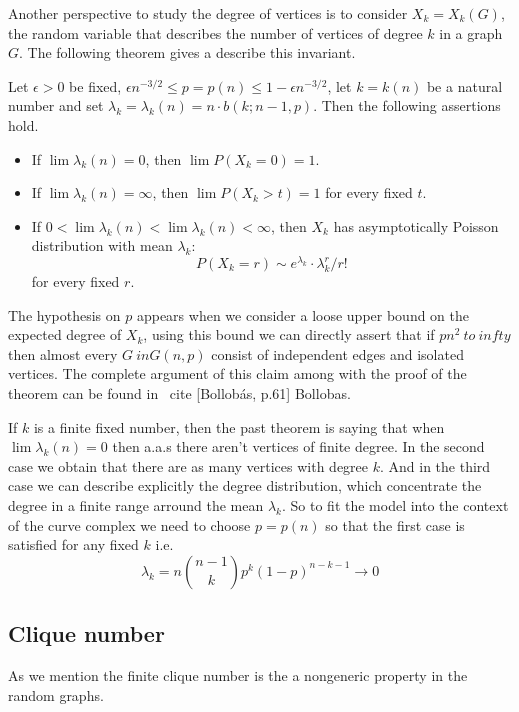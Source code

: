 Another perspective to study the degree of vertices is to consider $X_{k} = X_{k} (G)$, the random variable that describes the number of vertices of degree $k$ in a graph $G$. The following theorem gives a describe this invariant.

\begin{theorem}
Let $\epsilon>0$ be fixed, $\epsilon n^{-3/2} \leq p = p(n) \leq 1 - \epsilon n^{-3/2}$, let $k = k(n)$ be a natural number and set $\lambda_{k} = \lambda_{k}(n) = n\cdot b(k;n - 1,p)$. Then the following assertions hold.

\begin{itemize}
\item If $\lim \lambda_{k}(n) = 0$, then $\lim P(X_{k} = 0) = 1$. 
\item If $\lim \lambda_{k}(n) = \infty$, then $\lim P(X_{k} > t) = 1$
for every fixed $t$.
\item If $0 < \lim\lambda_{k}(n) < \lim \lambda_{k}(n) < \infty$,
then $X_{k}$ has asymptotically Poisson distribution with mean $\lambda_{k}$: 
$$P(X_{k} = r) \sim e^{\lambda_{k}}\cdot \lambda_{k}^{r}/ r!$$
for every fixed $r$.
\end{itemize}
\end{theorem}

The hypothesis on $ p $ appears when we consider a loose upper bound on the expected degree of $ X_ {k} $, using this bound we can directly assert that if $ pn ^ {2} \ to \ infty $ then almost every $ G \ in G (n, p) $ consist of independent edges and isolated vertices. The complete argument of this claim among with the proof of the theorem can be found in \ cite [Bollobás, p.61] {Bollobas}.

If $k$ is a finite fixed number, then the past theorem is saying that when $\lim \lambda_{k}(n) = 0$ then a.a.s there aren't vertices of finite degree. In the second case we obtain that there are as many vertices with degree $k$. And in the third case we can describe explicitly the degree distribution, which concentrate the degree in a finite range arround the mean $\lambda_{k}$. So to fit the model into the context of the curve complex we need to choose $p = p(n)$ so that the first case is satisfied for any fixed $k$ i.e.
$$\lambda_{k} = n \binom{n-1}{k} p^{k} (1-p)^{n-k-1} \to 0$$

\subsection{Clique number}

As we mention the finite clique number is the a nongeneric property in the random graphs. 

